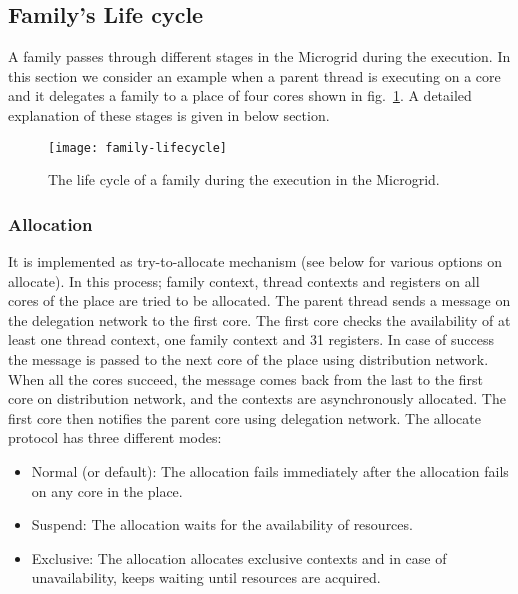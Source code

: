 \documentclass{article}
\begin{document}
\subsection{Family's Life cycle}\label{sn:family_lifecycle}

A family passes through different stages in the Microgrid during the execution.
In this section we consider an example when a parent thread is executing on a
core and it delegates a family to a place of four cores shown
in fig.~\ref{fig:family_lifecycle}. A detailed explanation of these stages is
given in below section. 

\begin{figure}

\begin{centering}

\texttt{[image: family-lifecycle]}

\caption{\label{fig:family_lifecycle}The life cycle of a family during the
execution in the Microgrid.}

\end{centering}

\end{figure}

\subsubsection*{Allocation}\label{sn:allocation_families}

It is implemented as try-to-allocate mechanism (see below for various options
on allocate). In this process; family context, thread contexts and registers on
all cores of the place are tried to be allocated. The parent thread sends a
message on the delegation network to the first core. The first core checks
the availability of at least one thread context, one family context and 31
registers. In case of success the message is passed to the next core of the
place using distribution network. When all the cores succeed, the message comes
back from the last to the first core on distribution network, and the contexts
are asynchronously allocated. The first core then notifies the parent core
using delegation network. The allocate protocol has three different modes:

\begin{itemize}

\item Normal (or default): The allocation fails immediately after the
    allocation fails on any core in the place.

\item Suspend: The allocation waits for the availability of resources.

\item Exclusive: The allocation allocates exclusive contexts and in case of
    unavailability, keeps waiting until resources are acquired.

\end{itemize}
\end{document}

